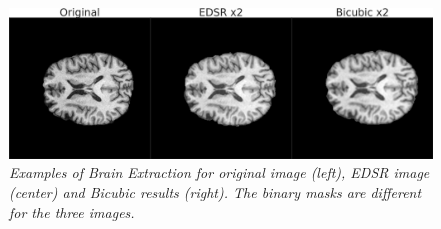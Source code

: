 \documentclass[12pt,a4paper]{report}
\begin{document}
\begin{figure}[H]
  \centering
  \includegraphics[scale=0.28]{./images/bet_example.png}
 \caption{\it Examples of Brain Extraction for original image (left), EDSR image (center) and Bicubic results (right). The binary masks are different for the three images.}
 \label{fig:bet-example}
\end{figure}

% 
% 
% 
% 
\end{document}
